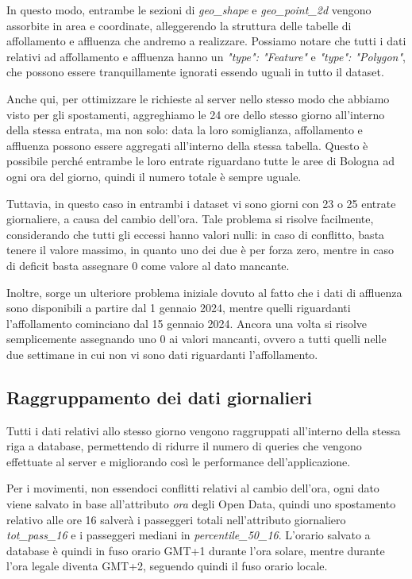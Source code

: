 In questo modo, entrambe le sezioni di \textit{geo\_shape} e \textit{geo\_point\_2d} vengono assorbite in area e coordinate, alleggerendo la struttura delle tabelle di affollamento e affluenza che andremo a realizzare. Possiamo notare che tutti i dati relativi ad affollamento e affluenza hanno un \textit{"type": "Feature"} e \textit{"type": "Polygon"}, che possono essere tranquillamente ignorati essendo uguali in tutto il dataset.

Anche qui, per ottimizzare le richieste al server nello stesso modo che abbiamo visto per gli spostamenti, aggreghiamo le 24 ore dello stesso giorno all'interno della stessa entrata, ma non solo: data la loro somiglianza, affollamento e affluenza possono essere aggregati all'interno della stessa tabella. Questo è possibile perché entrambe le loro entrate riguardano tutte le aree di Bologna ad ogni ora del giorno, quindi il numero totale è sempre uguale.

Tuttavia, in questo caso in entrambi i dataset vi sono giorni con 23 o 25 entrate giornaliere, a causa del cambio dell'ora. Tale problema si risolve facilmente, considerando che tutti gli eccessi hanno valori nulli: in caso di conflitto, basta tenere il valore massimo, in quanto uno dei due è per forza zero, mentre in caso di deficit basta assegnare 0 come valore al dato mancante.

Inoltre, sorge un ulteriore problema iniziale dovuto al fatto che i dati di affluenza sono disponibili a partire dal 1 gennaio 2024, mentre quelli riguardanti l'affollamento cominciano dal 15 gennaio 2024. Ancora una volta si risolve semplicemente assegnando uno 0 ai valori mancanti, ovvero a tutti quelli nelle due settimane in cui non vi sono dati riguardanti l'affollamento.

\subsection{Raggruppamento dei dati giornalieri}
Tutti i dati relativi allo stesso giorno vengono raggruppati all'interno della stessa riga a database, permettendo di ridurre il numero di queries che vengono effettuate al server e migliorando così le performance dell'applicazione.

Per i movimenti, non essendoci conflitti relativi al cambio dell'ora, ogni dato viene salvato in base all'attributo \textit{ora} degli Open Data, quindi uno spostamento relativo alle ore 16 salverà i passeggeri totali nell'attributo giornaliero \textit{tot\_pass\_16} e i passeggeri mediani in \textit{percentile\_50\_16}. L'orario salvato a database è quindi in fuso orario GMT+1 durante l'ora solare, mentre durante l'ora legale diventa GMT+2, seguendo quindi il fuso orario locale.

